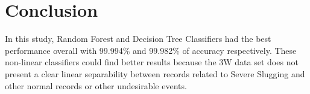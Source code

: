 \documentclass{article}
\begin{document}
\section{Conclusion}

In this study, Random Forest and Decision Tree Classifiers had the best performance overall with 99.994\% and 99.982\% of accuracy respectively. These non-linear classifiers could find better results because the 3W data set does not present a clear linear separability between records related to Severe Slugging and other normal records or other undesirable events.

\printbibliography
\end{document}
